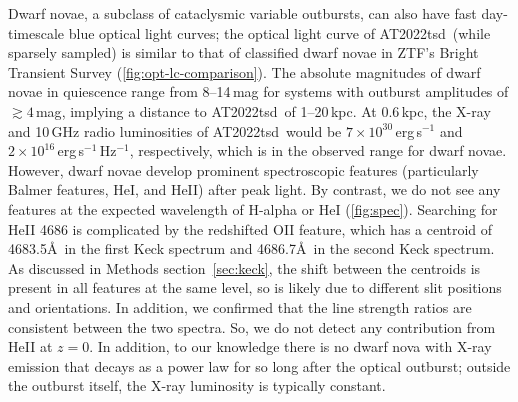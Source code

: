\documentclass{nature_plusfigure}
\newcommand{\at}{AT2022tsd}
\begin{document}
\begin{methods}
Dwarf novae, a subclass of cataclysmic variable outbursts, can also have fast day-timescale blue optical light curves; the optical light curve of \at\ (while sparsely sampled) is similar to that of classified dwarf novae in ZTF's Bright Transient Survey\cite{PerleyBTS} (\ref{fig:opt-lc-comparison}). The absolute magnitudes of dwarf novae in quiescence range from 8--14\,mag for systems with outburst amplitudes of $\gtrsim4\,$mag\cite{Szkody2021}, implying a distance to \at\ of 1--20\,kpc. At 0.6\,kpc, the X-ray and 10\,GHz radio luminosities of \at\ would be $7\times10^{30}\,$erg\,s$^{-1}$ and $2\times10^{16}$\,erg\,s$^{-1}$\,Hz$^{-1}$, respectively, which is in the observed range for dwarf novae\cite{Polzin2022,Coppejans2020_CV}. 
However, dwarf novae develop prominent spectroscopic features (particularly Balmer features, HeI, and HeII) after peak light\cite{Morales-Rueda2002,Han2020}. By contrast, we do not see any features at the expected wavelength of H-alpha or HeI (\ref{fig:spec}). Searching for HeII 4686 is complicated by the redshifted OII feature, which has a centroid of 4683.5\AA\ in the first Keck spectrum and 4686.7\AA\ in the second Keck spectrum. 
As discussed in Methods section~\ref{sec:keck}, the shift between the centroids is present in all features at the same level, so is likely due to different slit positions and orientations. In addition, we confirmed that the line strength ratios are consistent between the two spectra. So, we do not detect any contribution from HeII at $z=0$.
In addition, to our knowledge there is no dwarf nova with X-ray emission that decays as a power law for so long after the optical outburst; outside the outburst itself, the X-ray luminosity is typically constant\cite{Fertig2011}.


\end{methods}
\end{document}
